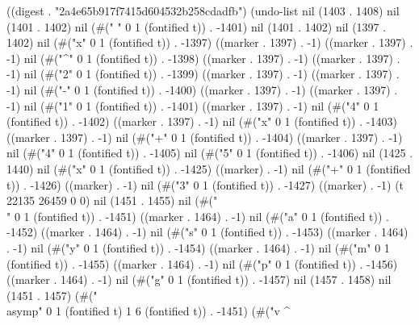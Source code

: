
((digest . "2a4e65b917f7415d604532b258cdadfb") (undo-list nil (1403 . 1408) nil (1401 . 1402) nil (#(" " 0 1 (fontified t)) . -1401) nil (1401 . 1402) nil (1397 . 1402) nil (#("x" 0 1 (fontified t)) . -1397) ((marker . 1397) . -1) ((marker . 1397) . -1) nil (#("^" 0 1 (fontified t)) . -1398) ((marker . 1397) . -1) ((marker . 1397) . -1) nil (#("2" 0 1 (fontified t)) . -1399) ((marker . 1397) . -1) ((marker . 1397) . -1) nil (#("-" 0 1 (fontified t)) . -1400) ((marker . 1397) . -1) ((marker . 1397) . -1) nil (#("1" 0 1 (fontified t)) . -1401) ((marker . 1397) . -1) nil (#("4" 0 1 (fontified t)) . -1402) ((marker . 1397) . -1) nil (#("x" 0 1 (fontified t)) . -1403) ((marker . 1397) . -1) nil (#("+" 0 1 (fontified t)) . -1404) ((marker . 1397) . -1) nil (#("4" 0 1 (fontified t)) . -1405) nil (#("5" 0 1 (fontified t)) . -1406) nil (1425 . 1440) nil (#("x" 0 1 (fontified t)) . -1425) ((marker) . -1) nil (#("+" 0 1 (fontified t)) . -1426) ((marker) . -1) nil (#("3" 0 1 (fontified t)) . -1427) ((marker) . -1) (t 22135 26459 0 0) nil (1451 . 1455) nil (#("\\" 0 1 (fontified t)) . -1451) ((marker . 1464) . -1) nil (#("a" 0 1 (fontified t)) . -1452) ((marker . 1464) . -1) nil (#("s" 0 1 (fontified t)) . -1453) ((marker . 1464) . -1) nil (#("y" 0 1 (fontified t)) . -1454) ((marker . 1464) . -1) nil (#("m" 0 1 (fontified t)) . -1455) ((marker . 1464) . -1) nil (#("p" 0 1 (fontified t)) . -1456) ((marker . 1464) . -1) nil (#("g" 0 1 (fontified t)) . -1457) nil (1457 . 1458) nil (1451 . 1457) (#("\\asymp" 0 1 (fontified t) 1 6 (fontified t)) . -1451) (#("v
^
